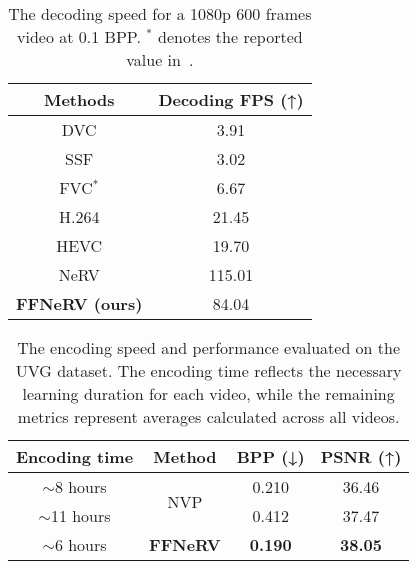 \documentclass[sigconf]{acmart}
\begin{document}
\begin{table}[]
\centering
\caption{The decoding speed for a 1080p 600 frames video at 0.1 BPP. $^*$ denotes the reported value in~\cite{fvc_adv}.}
\vskip 0.15in
\begin{tabular}{c|c}\hline
Methods & Decoding FPS (↑) \\\hline\hline
DVC \cite{dvc}     & 3.91             \\
SSF \cite{ssf}    & 3.02         \\
FVC$^*$ \cite{fvc}    & 6.67         \\\hline
H.264 \cite{h264}   & 21.45             \\
HEVC \cite{hevc}   & 19.70             \\\hline
NeRV \cite{nerv}    & 115.01             \\
\textbf{FFNeRV (ours)}  & 84.04             \\\hline
\end{tabular}
\label{tab:dec}
\end{table}


\begin{table}[]
\centering
\caption{The encoding speed and performance evaluated on the UVG dataset. The encoding time reflects the necessary learning duration for each video, while the remaining metrics represent averages calculated across all videos.}
\begin{tabular}{c|c||cc}
\hline
Encoding time  & Method               & BPP (↓) & PSNR (↑) \\ \hline\hline
$\sim$8 hours       & \multirow{2}{*}{NVP} & 0.210   & 36.46    \\
$\sim$11 hours &                      & 0.412   & 37.47    \\ \hline
$\sim$6 hours  & \textbf{FFNeRV}               & \textbf{0.190}   & \textbf{38.05}    \\ \hline
\end{tabular}
\label{tab:enc}
\end{table}
\end{document}
